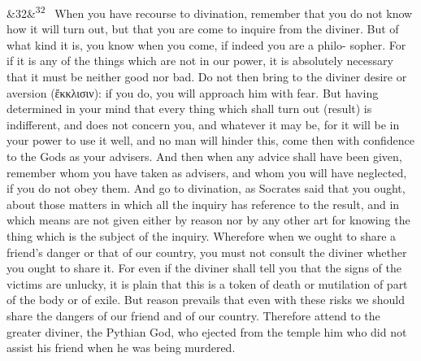 \documentclass[12pt]{article}
\newcommand{\para}[1][]{\par\noindent\ifx&#1&\else\textsuperscript{\footnotesize #1}~\fi}
\begin{document}
\para[32] When you have recourse to divination, remember that you do not know how it will turn out, but that you are come to inquire from the diviner. But of what kind it is, you know when you come, if indeed you are a philo- sopher. For if it is any of the things which are not in our power, it is absolutely necessary that it must be neither good nor bad. Do not then bring to the diviner desire or aversion (ἔκκλισιν): if you do, you will approach him with fear. But having determined in your mind that every thing which shall turn out (result) is indifferent, and does not concern you, and whatever it may be, for it will be in your power to use it well, and no man will hinder this, come then with confidence to the Gods as your advisers. And then when any advice shall have been given, remember whom you have taken as advisers, and whom you will have neglected, if you do not obey them. And go to divination, as Socrates said that you ought, about those matters in which all the inquiry has reference to the result, and in which means are not given either by reason nor by any other art for knowing the thing which is the subject of the inquiry. Wherefore when we ought to share a friend's danger or that of our country, you must not consult the diviner whether you ought to share it. For even if the diviner shall tell you that the signs of the victims are unlucky, it is plain that this is a token of death or mutilation of part of the body or of exile. But reason prevails that even with these risks we should share the dangers of our friend and of our country. Therefore attend to the greater diviner, the Pythian God, who ejected from the temple him who did not assist his friend when he was being murdered.
\end{document}
